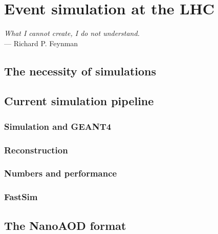 \chapter{Event simulation at the LHC}\label{ch:introduction}
\begin{flushright}{\slshape
        What I cannot create, I do not understand.} \\ \medskip
    --- Richard P. Feynman
\end{flushright}

\section{The necessity of simulations}

\section{Current simulation pipeline}

\subsection{Simulation and GEANT4}

\subsection{Reconstruction}

\subsection{Numbers and performance}

\subsection{FastSim}

\section{The NanoAOD format}




